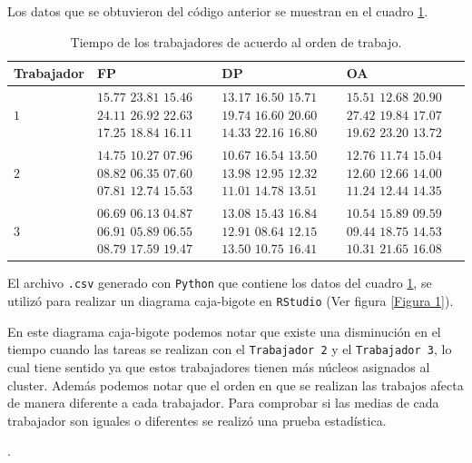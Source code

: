 \documentclass{article}
\begin{document}
Los datos que se obtuvieron del código anterior se muestran en el cuadro \ref{Cuadro 2}.

\begin{table}[ht]
\centering
\caption{Tiempo de los trabajadores de acuerdo al orden de trabajo.}
\smallskip

 \begin{tabular}{|p{2cm}|p{4cm}|p{4.2cm}|p{4.2cm}|}
 \hline
 Trabajador & FP & DP & OA \\ \hline
 $1$ & $15.77$ $23.81$ $15.46$ $24.11$ $26.92$ $22.63$ $17.25$ $18.84$ $16.11$ & $13.17$ $16.50$ $15.71$ $19.74$ $16.60$ $20.60$ $14.33$ $22.16$ $16.80$ & $15.51$ $12.68$ $20.90$ $27.42$ $19.84$ $17.07$ $19.62$ $23.20$ $13.72$\\ \hline
 $2$ & $14.75$ $10.27$ $07.96$ $08.82$ $06.35$ $07.60$ $07.81$ $12.74$ $15.53$ & $10.67$ $16.54$ $13.50$ $13.98$ $12.95$ $12.32$ $11.01$ $14.78$ $13.51$ & $12.76$ $11.74$ $15.04$ $12.60$ $12.66$ $14.00$ $11.24$ $12.44$ $14.35$ \\ \hline
 $3$ & $06.69$ $06.13$ $04.87$ $06.91$ $05.89$ $06.55$ $08.79$ $17.59$ $19.47$ & $13.08$ $15.43$ $16.84$ $12.91$ $08.64$ $12.15$ $13.50$ $10.75$ $16.41$ & $10.54$ $15.89$ $09.59$ $09.44$ $18.75$ $14.53$ $10.31$ $21.65$ $16.08$\\ \hline
\end{tabular}
\label{Cuadro 2}
\end{table}
\bigskip

El archivo \texttt{.csv} generado con \texttt{Python} que contiene los datos del cuadro \ref{Cuadro 2}, se utilizó para realizar un diagrama caja-bigote en \texttt{RStudio} (Ver figura \ref{Figura 1}).
\bigskip

En este diagrama caja-bigote podemos notar que existe una disminución en el tiempo cuando las tareas se realizan con el \texttt{Trabajador 2} y el \texttt{Trabajador 3}, lo cual tiene sentido ya que estos trabajadores tienen más núcleos asignados al cluster. Además podemos notar que el orden en que se realizan las trabajos afecta de manera diferente a cada trabajador. Para comprobar si las medias de cada trabajador son iguales o diferentes se realizó una prueba estadística. 

\newpage
.
\bigskip
\end{document}
